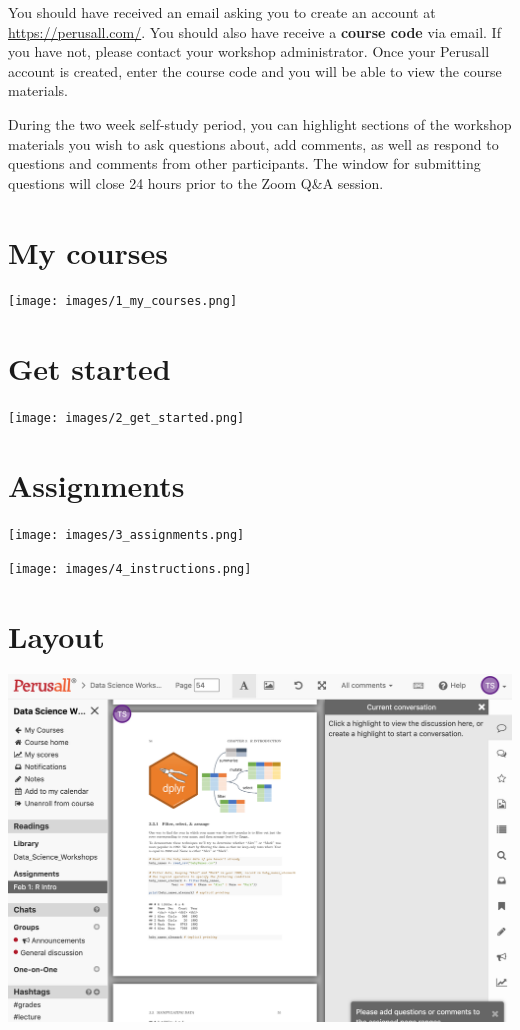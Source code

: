 \documentclass[]{book}
\begin{document}
You should have received an email asking you to create an account at \url{https://perusall.com/}. You should also have receive a \textbf{course code} via email. If you have not, please contact your workshop administrator. Once your Perusall account is created, enter the course code and you will be able to view the course materials.

During the two week self-study period, you can highlight sections of the workshop materials you wish to ask questions about, add comments, as well as respond to questions and comments from other participants. The window for submitting questions will close 24 hours prior to the Zoom Q\&A session.

\hypertarget{my-courses}{%
\section{My courses}\label{my-courses}}

\texttt{[image: images/1\_my\_courses.png]}

\hypertarget{get-started}{%
\section{Get started}\label{get-started}}

\texttt{[image: images/2\_get\_started.png]}

\hypertarget{assignments}{%
\section{Assignments}\label{assignments}}

\texttt{[image: images/3\_assignments.png]}

\texttt{[image: images/4\_instructions.png]}

\hypertarget{layout}{%
\section{Layout}\label{layout}}

\includegraphics{images/5_layout.png}
\end{document}
